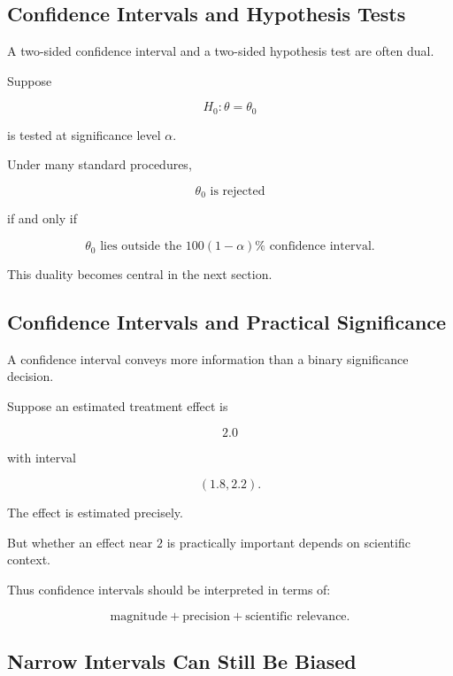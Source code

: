 \subsection{Confidence Intervals and Hypothesis Tests}
\label{subsec:confidence-test-duality}

A two-sided confidence interval and a two-sided hypothesis test are often
dual.

Suppose

\[
H_0:\theta=\theta_0
\]

is tested at significance level \(\alpha\).

Under many standard procedures,

\[
\boxed{
\theta_0
\text{ is rejected}
}
\]

if and only if

\[
\boxed{
\theta_0
\text{ lies outside the }100(1-\alpha)\%\text{ confidence interval}.
}
\]

This duality becomes central in the next section.

\subsection{Confidence Intervals and Practical Significance}
\label{subsec:ci-practical-significance}

A confidence interval conveys more information than a binary
significance decision.

Suppose an estimated treatment effect is

\[
2.0
\]

with interval

\[
(1.8,2.2).
\]

The effect is estimated precisely.

But whether an effect near \(2\) is practically important depends on
scientific context.

Thus confidence intervals should be interpreted in terms of:

\[
\boxed{
\text{magnitude}
+
\text{precision}
+
\text{scientific relevance}.
}
\]

\subsection{Narrow Intervals Can Still Be Biased}
\label{subsec:narrow-ci-biased}

